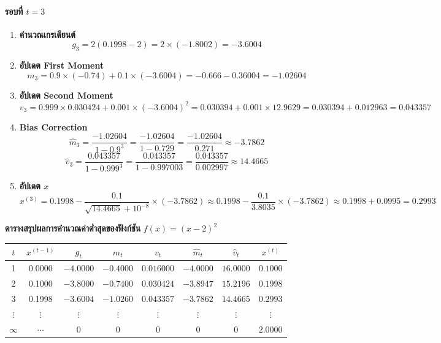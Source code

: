 \paragraph{รอบที่ $t = 3$}

\begin{enumerate}
    \item \textbf{คำนวณเกรเดียนต์ } 
    $$g_3 = 2(0.1998 - 2) = 2 \times (-1.8002) = -3.6004$$

    \item \textbf{อัปเดต First Moment } 
    $$m_3 = 0.9 \times (-0.74) + 0.1 \times (-3.6004) = -0.666 - 0.36004 = -1.02604$$

    \item \textbf{อัปเดต Second Moment } 
    $$v_3 = 0.999 \times 0.030424 + 0.001 \times (-3.6004)^2 = 0.030394 + 0.001 \times 12.9629 = 0.030394 + 0.012963 = 0.043357$$

    \item \textbf{Bias Correction } 
    $$\hat{m}_3 = \frac{-1.02604}{1 - 0.9^3} = \frac{-1.02604}{1 - 0.729} = \frac{-1.02604}{0.271} \approx -3.7862$$
    $$\hat{v}_3 = \frac{0.043357}{1 - 0.999^3} = \frac{0.043357}{1 - 0.997003} = \frac{0.043357}{0.002997} \approx 14.4665$$

    \item \textbf{อัปเดต $x$ } 
    $$x^{(3)} = 0.1998 - \frac{0.1}{\sqrt{14.4665} + 10^{-8}} \times (-3.7862) \approx 0.1998 - \frac{0.1}{3.8035} \times (-3.7862) \approx 0.1998 + 0.0995 = 0.2993$$
\end{enumerate}

\noindent
\textbf{ตารางสรุปผลการคำนวณค่าต่ำสุดของฟังก์ชัน} $f(x) = (x-2)^2$ 

\begin{center}
\renewcommand{\arraystretch}{1.4}
\small
\begin{tabular}{|c|c|c|c|c|c|c|c|}
\hline
$t$ & $x^{(t-1)}$ & $g_t$ & $m_t$ & $v_t$ & $\hat{m}_t$ & $\hat{v}_t$ & $x^{(t)}$ \\
\hline
1 & 0.0000 & $-4.0000$ & $-0.4000$ & $0.016000$ & $-4.0000$ & $16.0000$ & $0.1000$ \\
\hline
2 & 0.1000 & $-3.8000$ & $-0.7400$ & $0.030424$ & $-3.8947$ & $15.2196$ & $0.1998$ \\
\hline
3 & 0.1998 & $-3.6004$ & $-1.0260$ & $0.043357$ & $-3.7862$ & $14.4665$ & $0.2993$ \\
\hline
$\vdots$ & $\vdots$ & $\vdots$ & $\vdots$ & $\vdots$ & $\vdots$ & $\vdots$ & $\vdots$ \\
\hline
$\infty$ & $\cdots$ & $0$ & $0$ & $0$ & $0$ & $0$ & $2.0000$ \\
\hline
\end{tabular}
\end{center}

